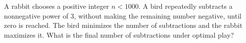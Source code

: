 A rabbit chooses a positive integer $n<1000$. A bird repeatedly subtracts a nonnegative power of $3$, without making the remaining number negative, until zero is reached. The bird minimizes the number of subtractions and the rabbit maximizes it. What is the final number of subtractions under optimal play?
